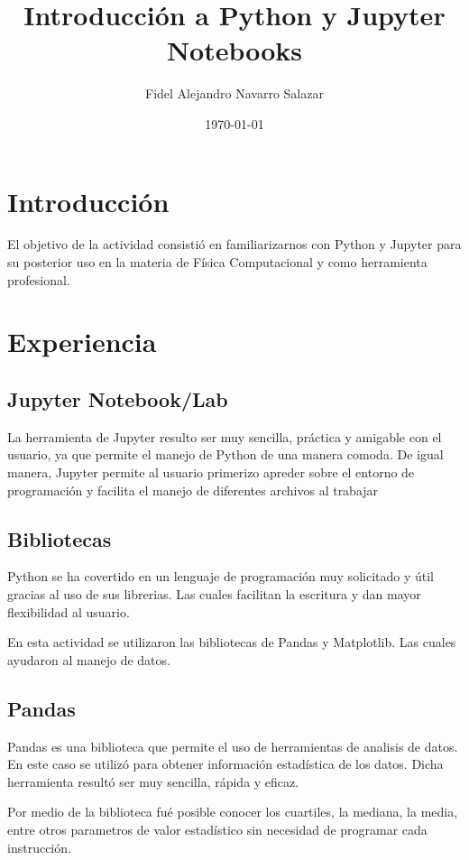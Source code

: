 \documentclass[a4paper]{article}
\title{Introducción a Python y Jupyter Notebooks}
\author{Fidel Alejandro Navarro Salazar}
\date{\today}
\begin{document}
\maketitle

\section{Introducción}
\label{sec:introduction}

El objetivo de la actividad consistió en familiarizarnos con Python y Jupyter para su posterior uso en la materia de Física Computacional y como herramienta profesional. 

\section{Experiencia}
\label{sec:theory}

\subsection{Jupyter Notebook/Lab}
La herramienta de Jupyter resulto ser muy sencilla, práctica y amigable con el usuario, ya que permite el manejo de Python de una manera comoda. De igual manera, Jupyter permite al usuario primerizo apreder sobre el entorno de programación y facilita el manejo de diferentes archivos al trabajar 


\subsection{Bibliotecas}
Python se ha covertido en un lenguaje de programación muy solicitado y útil gracias al uso de sus librerias. Las cuales facilitan la escritura y dan mayor flexibilidad al usuario.

En esta actividad se utilizaron las bibliotecas de Pandas y Matplotlib. Las cuales ayudaron al manejo de datos.



\subsection{Pandas}
Pandas es una biblioteca que permite el uso de herramientas de analisis de datos. En este caso se utilizó para obtener información estadística de los datos. Dicha herramienta resultó ser muy sencilla, rápida y eficaz.

Por medio de la biblioteca fué posible conocer los cuartiles, la mediana, la media, entre otros parametros de valor estadístico sin necesidad de programar cada instrucción.
\end{document}
